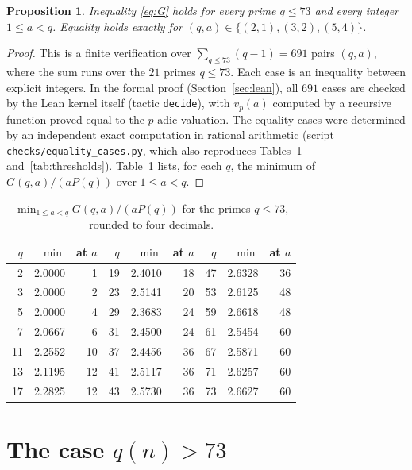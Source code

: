 \documentclass[11pt,a4paper]{amsart}
\newtheorem{proposition}[theorem]{Proposition}
\theoremstyle{definition}
\theoremstyle{remark}
\begin{document}
\begin{proposition}\label{prop:small}
Inequality \eqref{eq:G} holds for every prime $q \le 73$ and every integer $1\le a<q$. Equality holds exactly for $(q,a) \in \{(2,1),(3,2),(5,4)\}$.
\end{proposition}

\begin{proof}
This is a finite verification over $\sum_{q\le 73}(q-1) = 691$ pairs $(q,a)$, where the sum runs over the $21$ primes $q \le 73$. Each case is an inequality between explicit integers. In the formal proof (Section~\ref{sec:lean}), all $691$ cases are checked by the Lean kernel itself (tactic \texttt{decide}), with $v_p(a)$ computed by a recursive function proved equal to the $p$-adic valuation. The equality cases were determined by an independent exact computation in rational arithmetic (script \texttt{checks/equality\_cases.py}, which also reproduces Tables~\ref{tab:small} and~\ref{tab:thresholds}). Table~\ref{tab:small} lists, for each $q$, the minimum of $G(q,a)/(aP(q))$ over $1\le a<q$.
\end{proof}

\begin{table}[ht]
\centering\small
\begin{tabular}{rrr@{\qquad}rrr@{\qquad}rrr}
\toprule
$q$ & $\min$ & at $a$ & $q$ & $\min$ & at $a$ & $q$ & $\min$ & at $a$\\
\midrule
2 & 2.0000 & 1 & 19 & 2.4010 & 18 & 47 & 2.6328 & 36\\
3 & 2.0000 & 2 & 23 & 2.5141 & 20 & 53 & 2.6125 & 48\\
5 & 2.0000 & 4 & 29 & 2.3683 & 24 & 59 & 2.6618 & 48\\
7 & 2.0667 & 6 & 31 & 2.4500 & 24 & 61 & 2.5454 & 60\\
11 & 2.2552 & 10 & 37 & 2.4456 & 36 & 67 & 2.5871 & 60\\
13 & 2.1195 & 12 & 41 & 2.5117 & 36 & 71 & 2.6257 & 60\\
17 & 2.2825 & 12 & 43 & 2.5730 & 36 & 73 & 2.6627 & 60\\
\bottomrule
\end{tabular}
\caption{$\min_{1\le a<q} G(q,a)/(a P(q))$ for the primes $q\le 73$, rounded to four decimals.}\label{tab:small}
\end{table}

\section{The case \texorpdfstring{$q(n) > 73$}{q(n) > 73}}\label{sec:large}
\end{document}
